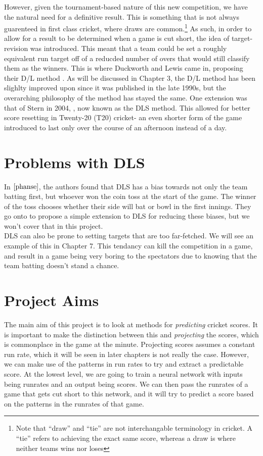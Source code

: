 However, given the tournament-based nature of this new competition, we have the natural need for a definitive result.
This is something that is not always guarenteed in first class cricket, where draws are common.\footnote{Note that 
``draw'' and ``tie'' are not interchangable terminology in cricket. A ``tie'' refers to achieving the exact same score, whereas a draw is where neither teams wins nor loses} As such, in order to allow for a result to be
determined when a game is cut short, the idea of target-revision was introduced. This meant that a team could be set a
roughly equivalent run target off of a reducded number of overs that would still classify them as the winners.
This is where Duckworth and Lewis came in, proposing their D/L method \cite{duckworth}. As will be discussed in Chapter 3, the D/L method 
has been slighlty improved upon since it was published in the late 1990s, but the overarching philosophy of the method has stayed the same. 
One extension was that of Stern in 2004, \cite{stern}, now  known as the DLS method. This allowed for better score resetting in Twenty-20 (T20) cricket- an even shorter 
form of the game introduced to last only over the course of an afternoon instead of a day. 


\section{Problems with DLS}
In $\cite{phanse}$, the authors found that DLS has a bias towards not only the team batting first, but whoever won the coin toss at the start of the game.
The winner of the toss chooses whether their side will bat or bowl in the first innings. They go onto to propose a simple extension to DLS for reducing
these biases, but we won't cover that in this project. \\

DLS can also be prone to setting targets that are too far-fetched. We will see an example of this in Chapter 7. This tendancy can kill the competition in a game, 
and result in a game being very boring to the spectators due to knowing that the team batting doesn't stand a chance. \\

\section{Project Aims}
The main aim of this project is to look at methods for \textit{predicting} cricket scores. It is important to make the distinction between this 
and \textit{projecting} the scores, which is commonplace in the game at the minute. Projecting scores assumes a constant run rate, which it will be seen 
in later chapters is not really the case. However, we can make use of the patterns in run rates to try and extract a predictable score. At the lowest level,
we are going to train a neural network with inputs being runrates and an output being scores. We can then pass the runrates of a game that gets cut short 
to this network, and it will try to predict a score based on the patterns in the runrates of that game.


